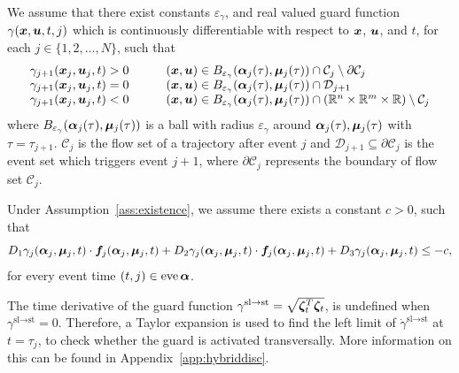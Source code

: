 \documentclass[../DC2017114Bouma.tex]{subfiles}
\begin{document}
\begin{myass}\label{ass:existence}
We assume that there exist constants $\varepsilon_\gamma$, and real valued guard function $\gamma({\boldsymbol{x}},{\boldsymbol{u}},t,j)$ which is continuously differentiable with respect to ${\boldsymbol{x}}$, ${\boldsymbol{u}}$, and $t$, for each $j\in \{1,2,\dots,N\}$, such that
\begin{equation}
\begin{array}{llll}
\gamma_{j+1}({\boldsymbol{x}}_j,{\boldsymbol{u}}_j,t) > 0 & &	&({\boldsymbol{x}},{\boldsymbol{u}}) \in B_{\varepsilon_\gamma}(\boldsymbol{\alpha}_j(\tau),\boldsymbol{\mu}_j(\tau))\cap \mathcal{C}_j\setminus\partial \mathcal{C}_j\\
\gamma_{j+1}({\boldsymbol{x}}_j,{\boldsymbol{u}}_j,t) = 0 & &	&({\boldsymbol{x}},{\boldsymbol{u}}) \in B_{\varepsilon_\gamma}(\boldsymbol{\alpha}_j(\tau),\boldsymbol{\mu}_j(\tau))\cap \mathcal{D}_{j+1}\\
\gamma_{j+1}({\boldsymbol{x}}_j,{\boldsymbol{u}}_j,t) < 0 & &	&({\boldsymbol{x}},{\boldsymbol{u}}) \in B_{\varepsilon_\gamma}(\boldsymbol{\alpha}_j(\tau),\boldsymbol{\mu}_j(\tau))\cap (\mathbb{R}^n \times \mathbb{R}^m \times \mathbb{R})\setminus \mathcal{C}_j
\end{array}
\end{equation}
where $B_{\varepsilon_\gamma}(\boldsymbol{\alpha}_j(\tau),\boldsymbol{\mu}_j(\tau))$ is a ball with radius $\varepsilon_{\gamma}$ around $\boldsymbol{\alpha}_j(\tau),\boldsymbol{\mu}_j(\tau)$ with $\tau = \tau_{j+1}$. $\mathcal{C}_j$ is the flow set of a trajectory after event $j$ and $\mathcal{D}_{j+1}\subseteq\partial \mathcal{C}_j$ is the event set which triggers event $j+1$, where $\partial \mathcal{C}_j$ represents the boundary of flow set $\mathcal{C}_j$.
\end{myass}

\begin{myass}\label{ass:transversality}
Under Assumption~\ref{ass:existence}, we assume there exists a constant $c>0$, such that
\begin{equation}
D_1\gamma_j(\boldsymbol{\alpha}_j,\boldsymbol{\mu}_j,t)\cdot{\boldsymbol{f}}_j(\boldsymbol{\alpha}_j,\boldsymbol{\mu}_j,t) + D_2\gamma_j(\boldsymbol{\alpha}_j,\boldsymbol{\mu}_j,t)\cdot{\boldsymbol{f}}_j(\boldsymbol{\alpha}_j,\boldsymbol{\mu}_j,t) + D_3\gamma_j(\boldsymbol{\alpha}_j,\boldsymbol{\mu}_j,t) \leq -c,
\end{equation}
for every event time $(t,j) \in \operatorname{\textnormal{eve}} \boldsymbol{\alpha}$.
\end{myass}

\begin{myremark}
The time derivative of the guard function $\gamma^{\text{sl}\rightarrow\text{st}} = \sqrt{\boldsymbol{\zeta}_t^T\boldsymbol{\zeta}_t}$, is undefined when $\gamma^{\text{sl}\rightarrow\text{st}} = 0$. Therefore, a Taylor expansion is used to find the left limit of $\dot{\gamma}^{\text{sl}\rightarrow\text{st}}$ at $t = \tau_j$, to check whether the guard is activated transversally. More information on this can be found in Appendix~\ref{app:hybriddisc}.
\end{myremark}
\end{document}
